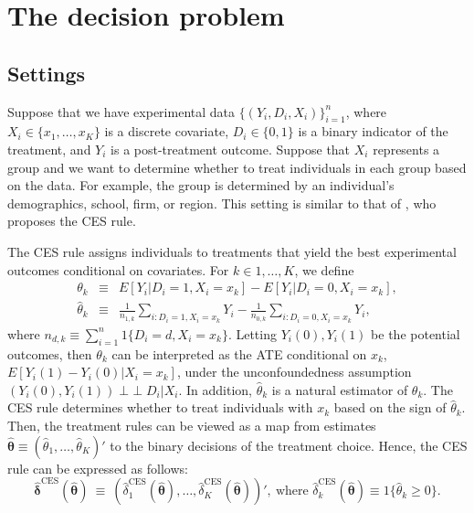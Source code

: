 \documentclass[12pt,a4paper]{article}
\newcommand{\indepe}{\mathop{\perp\!\!\!\perp}}
\begin{document}
\section{The decision problem}\label{Sec:decision-prob}

\subsection{Settings}\label{SubSec:setting}
Suppose that we have experimental data $\{(Y_i,D_i,X_i)\}_{i=1}^n$, where $X_i \in  \{x_1, \ldots, x_K\}$ is a discrete covariate, $D_i \in \{0,1\}$ is a binary indicator of the treatment, and $Y_i$ is a post-treatment outcome. Suppose that $X_i$ represents a group and we want to determine whether to treat individuals in each group based on the data. For example, the group is determined by an individual's demographics, school, firm, or region. This setting is similar to that of \cite{manski2004statistical}, who proposes the CES rule.

The CES rule assigns individuals to treatments that yield the best experimental outcomes conditional on covariates. For $k \in 1, \ldots, K$, we define
\begin{eqnarray}
\theta_k & \equiv & E\left[ Y_i | D_i=1, X_i = x_k \right] - E\left[ Y_i | D_i=0, X_i = x_k \right], \nonumber \\
\hat{\theta}_k & \equiv & \frac{1}{n_{1,k}} \sum_{i : D_i = 1, X_i = x_k} Y_i - \frac{1}{n_{0,k}} \sum_{i : D_i = 0, X_i = x_k} Y_i, \nonumber
\end{eqnarray}
where $n_{d,k} \equiv \sum_{i=1}^n 1\{D_i = d, X_i = x_k\}$. Letting $Y_i(0), Y_i(1)$ be the potential outcomes, then $\theta_k$ can be interpreted as the ATE conditional on $x_k$, $E[Y_i(1)-Y_i(0)|X_i=x_k]$, under the unconfoundedness assumption $(Y_i(0),Y_i(1)) \indepe D_i | X_i$. In addition, $\hat{\theta}_k$ is a natural estimator of $\theta_k$. The CES rule determines whether to treat individuals with $x_k$ based on the sign of $\hat{\theta}_k$. Then, the treatment rules can be viewed as a map from estimates $\hat{\bm{\theta}} \equiv (\hat{\theta}_1, \ldots, \hat{\theta}_K)'$ to the binary decisions of the treatment choice. Hence, the CES rule can be expressed as follows:
\begin{equation}
\hat{\bm{\delta}}^{\text{CES}}(\hat{\bm{\theta}}) \ \equiv \ \left( \hat{\delta}_1^{\text{CES}}(\hat{\bm{\theta}}), \ldots, \hat{\delta}_K^{\text{CES}}(\hat{\bm{\theta}}) \right)', \ \text{where $\hat{\delta}_k^{\text{CES}}(\hat{\bm{\theta}}) \equiv 1 \{ \hat{\theta}_k \geq 0 \}$.} \label{CES_rule}
\end{equation}
\end{document}
